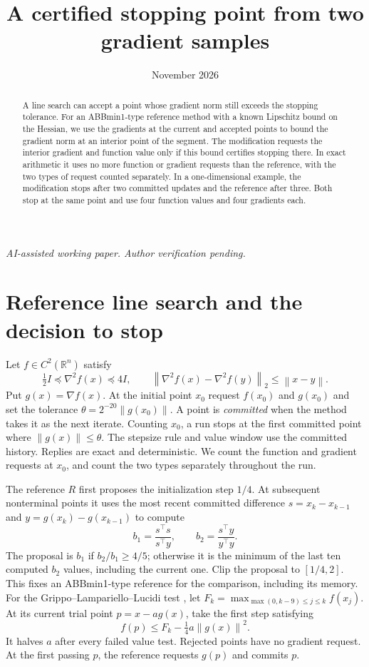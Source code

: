 \documentclass[11pt]{article}
\title{A certified stopping point from two gradient samples}
\author{}
\date{November 2026}
\newcommand{\norm}[1]{\left\lVert#1\right\rVert}
\newcommand{\R}{\mathbb R}
\begin{document}
\maketitle
\begin{center}\small\emph{AI-assisted working paper. Author verification pending.}\end{center}
\begin{abstract}
A line search can accept a point whose gradient norm still exceeds
the stopping tolerance. For an ABBmin1-type reference method with a
known Lipschitz bound on the Hessian, we use the gradients at the
current and accepted points to bound the gradient norm at an interior
point of the segment. The modification requests the interior gradient
and function value only if this bound certifies stopping there. In
exact arithmetic it uses no more function or gradient requests than
the reference, with the two types of request counted separately.
In a one-dimensional example, the modification stops after two
committed updates and the reference after three. Both stop at the
same point and use four function values and four gradients each.
\end{abstract}

\section{Reference line search and the decision to stop}

Let \(f\in C^2(\R^n)\) satisfy
\[
 \tfrac12 I\preceq\nabla^2 f(x)\preceq 4I,\qquad
 \norm{\nabla^2 f(x)-\nabla^2 f(y)}_2\le\norm{x-y}.
\]
Put \(g(x)=\nabla f(x)\). At the initial point \(x_0\) request \(f(x_0)\)
and \(g(x_0)\) and set the tolerance \(\theta=2^{-20}\norm{g(x_0)}\).
A point is \emph{committed} when the method takes it as the next
iterate. Counting \(x_0\), a run stops at the first committed point
where \(\norm{g(x)}\le\theta\). The stepsize rule and value window use
the committed history. Replies are exact and deterministic. We count
the function and gradient requests at \(x_0\), and count the two
types separately throughout the run.

The reference \(R\) first proposes the initialization step \(1/4\). At subsequent
nonterminal points it uses the most recent committed difference
\(s=x_k-x_{k-1}\) and \(y=g(x_k)-g(x_{k-1})\) to compute
\[
 b_1=\frac{s^\top s}{s^\top y},\qquad
 b_2=\frac{s^\top y}{y^\top y}.
\]
The proposal is \(b_1\) if \(b_2/b_1\ge 4/5\); otherwise it is the
minimum of the last ten computed \(b_2\) values, including the
current one. Clip the proposal to \([1/4,2]\). This fixes an
ABBmin1-type reference \cite{abb} for the comparison, including its memory.
For the Grippo--Lampariello--Lucidi test \cite{gll}, let
\(F_k=\max_{\max(0,k-9)\le j\le k}f(x_j)\).
At its current trial point \(p=x-a g(x)\), take the first step satisfying
\begin{equation}
 f(p)\le F_k-\tfrac14 a\norm{g(x)}^2.
 \label{eq:accept}
\end{equation}
It halves \(a\) after every failed value test. Rejected points
have no gradient request. At the first passing \(p\), the reference
requests \(g(p)\) and commits \(p\).
\end{document}
